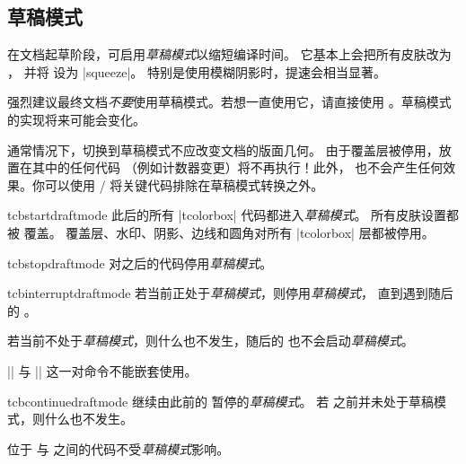 \clearpage
\subsection{草稿模式}\label{subsec:draftmode}
在文档起草阶段，可启用\emph{草稿模式}以缩短编译时间。
它基本上会把所有皮肤改为 ，
并将  设为 |squeeze|。
特别是使用模糊阴影时，提速会相当显著。

\begin{marker}
强烈建议最终文档\emph{不要}使用草稿模式。若想一直使用它，请直接使用
。草稿模式的实现将来可能会变化。
\end{marker}

\begin{marker}
通常情况下，切换到草稿模式不应改变文档的版面几何。
由于覆盖层被停用，放置在其中的任何代码
（例如计数器变更）将不再执行！此外，
也不会产生任何效果。你可以使用
 / 
将关键代码排除在草稿模式转换之外。
\end{marker}


\begin{docCommand}{tcbstartdraftmode}{}
  此后的所有 |tcolorbox| 代码都进入\emph{草稿模式}。
  所有皮肤设置都被  覆盖。
  覆盖层、水印、阴影、边线和圆角对所有 |tcolorbox| 层都被停用。
\end{docCommand}

\begin{docCommand}{tcbstopdraftmode}{}
  对之后的代码停用\emph{草稿模式}。
\end{docCommand}

\begin{docCommand}{tcbinterruptdraftmode}{}
  若当前正处于\emph{草稿模式}，则停用\emph{草稿模式}，
  直到遇到随后的 。\par
  若当前不处于\emph{草稿模式}，则什么也不发生，随后的
   也不会启动\emph{草稿模式}。
  \begin{marker}
  |\tcbinterruptdraftmode| 与 |\tcbcontinuedraftmode| 这一对命令不能嵌套使用。
  \end{marker}
\end{docCommand}

\begin{docCommand}{tcbcontinuedraftmode}{}
  继续由此前的  暂停的\emph{草稿模式}。
  若  之前并未处于草稿模式，则什么也不发生。
  \begin{marker}
  位于  与 
  之间的代码不受\emph{草稿模式}影响。
  \end{marker}
\end{docCommand}


